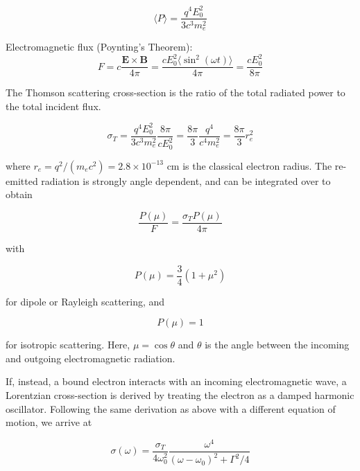 \documentclass[onecolumn]{aastex63}
\begin{document}
\begin{equation}
    \langle P \rangle = \frac{q^4E_0^2}{3c^3m_e^2}
\end{equation}

\noindent Electromagnetic flux (Poynting's Theorem):
\begin{equation}
    F = c\frac{\mathbf{E} \times \mathbf{B}}{4\pi} = \frac{cE_0^2 \langle \sin^2 (\omega t)\rangle}{4\pi} = \frac{cE_0^2}{8\pi}
\end{equation}

\noindent The Thomson scattering cross-section is the ratio of the total radiated power to the total incident flux. 

\begin{equation}
    \sigma_T = \frac{q^4 E_0^2}{3c^3m_e^2} \frac{8\pi}{cE_0^2} = \frac{8\pi}{3}\frac{q^4}{c^4m_e^2} = \frac{8\pi}{3}r_e^2
\end{equation}

where $r_e = q^2 / (m_ec^2)  = 2.8 \times 10^{-13}$ cm is the classical electron radius. The re-emitted radiation is strongly angle dependent, and can be integrated over to obtain

\begin{equation}
    \frac{P(\mu)}{F} = \frac{\sigma_T P(\mu)}{4\pi}
\end{equation}

 \noindent with
 
\begin{equation}
    P(\mu) = \frac{3}{4}(1 + \mu^2)
\end{equation}

\noindent for dipole or Rayleigh scattering, and 

\begin{equation}
    P(\mu) = 1
\end{equation}

for isotropic scattering. Here, $\mu = \cos{\theta}$ and $\theta$ is the angle between the incoming and outgoing electromagnetic radiation.

If, instead, a bound electron interacts with an incoming electromagnetic wave, a Lorentzian cross-section is derived by treating the electron as a damped harmonic oscillator. Following the same derivation as above with a different equation of motion, we arrive at 

\begin{equation}
    \sigma(\omega) = \frac{\sigma_T}{4\omega_0^2} \frac{\omega^4}{(\omega-\omega_0)^2 + \Gamma^2/4}
\end{equation}
\end{document}
